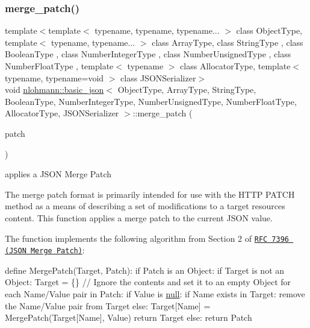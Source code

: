 \subsubsection{\texorpdfstring{merge\+\_\+patch()}{merge\_patch()}}
{\footnotesize\ttfamily template$<$template$<$ typename, typename, typename... $>$ class Object\+Type, template$<$ typename, typename... $>$ class Array\+Type, class String\+Type , class Boolean\+Type , class Number\+Integer\+Type , class Number\+Unsigned\+Type , class Number\+Float\+Type , template$<$ typename $>$ class Allocator\+Type, template$<$ typename, typename=void $>$ class J\+S\+O\+N\+Serializer$>$ \\
void \hyperlink{classnlohmann_1_1basic__json}{nlohmann\+::basic\+\_\+json}$<$ Object\+Type, Array\+Type, String\+Type, Boolean\+Type, Number\+Integer\+Type, Number\+Unsigned\+Type, Number\+Float\+Type, Allocator\+Type, J\+S\+O\+N\+Serializer $>$\+::merge\+\_\+patch (\begin{DoxyParamCaption}\item[{const \hyperlink{classnlohmann_1_1basic__json}{basic\+\_\+json}$<$ Object\+Type, Array\+Type, String\+Type, Boolean\+Type, Number\+Integer\+Type, Number\+Unsigned\+Type, Number\+Float\+Type, Allocator\+Type, J\+S\+O\+N\+Serializer $>$ \&}]{patch }\end{DoxyParamCaption})\hspace{0.3cm}{\ttfamily [inline]}}



applies a J\+S\+ON Merge Patch 

The merge patch format is primarily intended for use with the H\+T\+TP P\+A\+T\+CH method as a means of describing a set of modifications to a target resource\textquotesingle{}s content. This function applies a merge patch to the current J\+S\+ON value.

The function implements the following algorithm from Section 2 of \href{https://tools.ietf.org/html/rfc7396}{\tt R\+FC 7396 (J\+S\+ON Merge Patch)}\+:


\begin{DoxyCode}
define MergePatch(Target, Patch):
  if Patch is an Object:
    if Target is not an Object:
      Target = \{\} \textcolor{comment}{// Ignore the contents and set it to an empty Object}
    \textcolor{keywordflow}{for each} Name/Value pair in Patch:
      \textcolor{keywordflow}{if} Value is \hyperlink{namespacenlohmann_1_1detail_a1ed8fc6239da25abcaf681d30ace4985a37a6259cc0c1dae299a7866489dff0bd}{null}:
        \textcolor{keywordflow}{if} Name exists in Target:
          \textcolor{keyword}{remove} the Name/Value pair from Target
      \textcolor{keywordflow}{else}:
        Target[Name] = MergePatch(Target[Name], Value)
    \textcolor{keywordflow}{return} Target
  \textcolor{keywordflow}{else}:
    \textcolor{keywordflow}{return} Patch
\end{DoxyCode}


